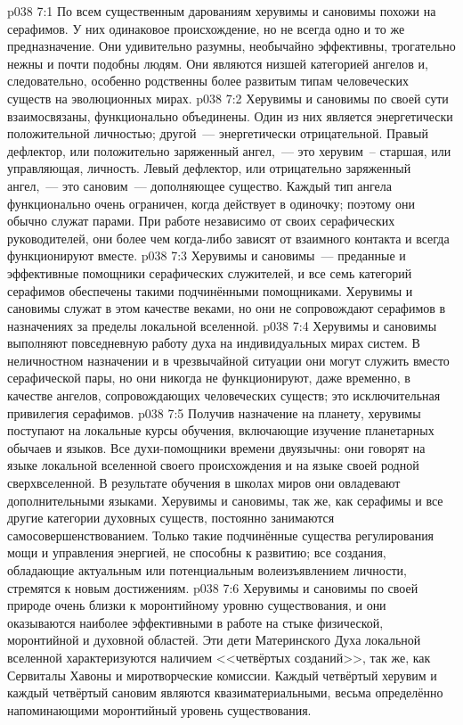 \vs p038 7:1 По всем существенным дарованиям херувимы и сановимы похожи на серафимов. У них одинаковое происхождение, но не всегда одно и то же предназначение. Они удивительно разумны, необычайно эффективны, трогательно нежны и почти подобны людям. Они являются низшей категорией ангелов и, следовательно, особенно родственны более развитым типам человеческих существ на эволюционных мирах.
\vs p038 7:2 Херувимы и сановимы по своей сути взаимосвязаны, функционально объединены. Один из них является энергетически положительной личностью; другой~--- энергетически отрицательной. Правый дефлектор, или положительно заряженный ангел,~--- это херувим~-- старшая, или управляющая, личность. Левый дефлектор, или отрицательно заряженный ангел,~--- это сановим~--- дополняющее существо. Каждый тип ангела функционально очень ограничен, когда действует в одиночку; поэтому они обычно служат парами. При работе независимо от своих серафических руководителей, они более чем когда\hyp{}либо зависят от взаимного контакта и всегда функционируют вместе.
\vs p038 7:3 \pc Херувимы и сановимы~--- преданные и эффективные помощники серафических служителей, и все семь категорий серафимов обеспечены такими подчинёнными помощниками. Херувимы и сановимы служат в этом качестве веками, но они не сопровождают серафимов в назначениях за пределы локальной вселенной.
\vs p038 7:4 Херувимы и сановимы выполняют повседневную работу духа на индивидуальных мирах систем. В неличностном назначении и в чрезвычайной ситуации они могут служить вместо серафической пары, но они никогда не функционируют, даже временно, в качестве ангелов, сопровождающих человеческих существ; это исключительная привилегия серафимов.
\vs p038 7:5 \pc Получив назначение на планету, херувимы поступают на локальные курсы обучения, включающие изучение планетарных обычаев и языков. Все духи\hyp{}помощники времени двуязычны: они говорят на языке локальной вселенной своего происхождения и на языке своей родной сверхвселенной. В результате обучения в школах миров они овладевают дополнительными языками. Херувимы и сановимы, так же, как серафимы и все другие категории духовных существ, постоянно занимаются самосовершенствованием. Только такие подчинённые существа регулирования мощи и управления энергией, не способны к развитию; все создания, обладающие актуальным или потенциальным волеизъявлением личности, стремятся к новым достижениям.
\vs p038 7:6 \pc Херувимы и сановимы по своей природе очень близки к моронтийному уровню существования, и они оказываются наиболее эффективными в работе на стыке физической, моронтийной и духовной областей. Эти дети Материнского Духа локальной вселенной характеризуются наличием <<четвёртых созданий>>, так же, как Сервиталы Хавоны и миротворческие комиссии. Каждый четвёртый херувим и каждый четвёртый сановим являются квазиматериальными, весьма определённо напоминающими моронтийный уровень существования.
